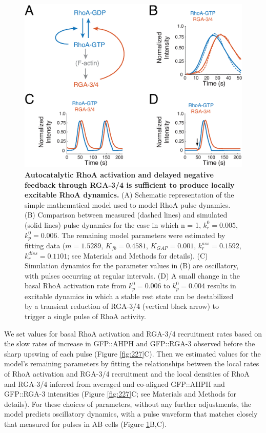 \begin{figure}[!htbp]
\centering
\includegraphics[width=1\textwidth]{pulse/Figure2-9}

\caption[Autocatalytic RhoA activation and delayed negative feedback through RGA-3/4 is sufficient to produce locally excitable RhoA dynamics.]{\label{fig:229}\textbf{Autocatalytic RhoA activation and delayed negative feedback through RGA-3/4 is sufficient to produce locally excitable RhoA dynamics.} (A) Schematic representation of the simple mathematical model used to model RhoA pulse dynamics. (B) Comparison between measured (dashed lines) and simulated (solid lines) pulse dynamics for the case in which n = 1, $k_{r}^0 = 0.005$, $k_{p}^0 = 0.006$.  The remaining model parameters were estimated by fitting data ($m=1.5289$, $K_{fb}=0.4581$, $K_{GAP}=0.001$, $k_{r}^{ass}=0.1592$, $k_{r}^{diss}=0.1101$; see Materials and Methods for details).  (C) Simulation dynamics for the parameter values in (B) are oscillatory, with pulses occurring at regular intervals.  (D)  A small change in the basal RhoA activation rate from $k_{p}^0 = 0.006$ to $k_{p}^0 = 0.004$ results in excitable dynamics in which a stable rest state can be destabilized by a transient reduction of RGA-3/4 (vertical black arrow) to trigger a single pulse of RhoA activity.}
\end{figure}



We set values for basal RhoA activation and RGA-3/4 recruitment rates based on the slow rates of increase in GFP::AHPH and GFP::RGA-3 observed before the sharp upswing of each pulse (Figure \ref{fig:227}C). Then we estimated values for the model’s remaining parameters by fitting the relationships between the local rates of RhoA activation and RGA-3/4 recruitment and the local densities of RhoA and RGA-3/4 inferred from averaged and co-aligned GFP::AHPH and GFP::RGA-3 intensities  (Figure \ref{fig:227}C; see Materials and Methods for details).   For these choices of parameters,  without any further adjustments, the model predicts oscillatory dynamics, with a pulse waveform that matches closely that measured for pulses in AB cells (Figure \ref{fig:229}B,C).  

